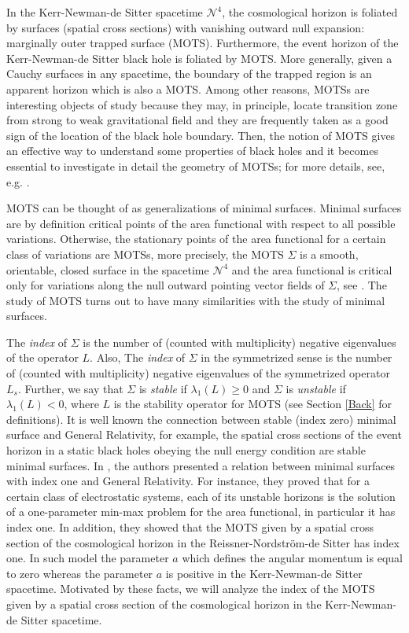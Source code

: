 \documentclass[a4paper, 11pt, reqno]{amsart}
\begin{document}
In the Kerr-Newman-de Sitter spacetime $\mathcal{N}^4$, the cosmological horizon is foliated by surfaces (spatial cross sections) with vanishing outward null expansion: marginally outer trapped surface (MOTS). Furthermore, the event horizon of the Kerr-Newman-de Sitter black hole is foliated by MOTS. More generally, given a Cauchy surfaces in any spacetime, the boundary of the trapped region is an apparent horizon which is also a MOTS. Among other reasons, MOTSs are interesting objects of study because they may, in principle, locate transition zone from strong to weak gravitational field and they are frequently taken as a good sign of the location of the black hole boundary. Then, the notion of MOTS gives an effective way to understand some properties of black holes and it becomes essential to investigate in detail the geometry of MOTSs; for more details, see, e.g. \cite{BKO, CGS,HE, HL, M}.  

MOTS can be thought of as generalizations of minimal surfaces. Minimal surfaces are by definition critical points of the area functional
with respect to all possible variations. Otherwise, the stationary points of the area functional for a certain class of variations are MOTSs, more precisely, the MOTS $\Sigma$ is a smooth, orientable, closed surface in the spacetime $\mathcal{N}^4$ and the area functional is critical only for variations along the null outward pointing vector fields of $\Sigma$, see \cite{M}.
 The study of MOTS turns out to have many similarities with the study of minimal surfaces. 

The {\it{index}} of $\Sigma$ is the number of (counted with multiplicity) negative eigenvalues of the operator $L$. Also, The {\it{index}} of $\Sigma$ in the symmetrized sense is the number of (counted with multiplicity) negative eigenvalues of the symmetrized operator $L_s$. Further, we say that $\Sigma$ is {\it{stable}} if  $\lambda_1(L)\geq0$ and $\Sigma$ is {\it{unstable}} if $\lambda_1(L)<0$, where $L$ is the stability operator for MOTS (see Section \ref{Back} for definitions). It is well known the connection between stable (index zero) minimal surface and General Relativity, for example, the spatial cross sections of the event horizon in a static black holes obeying the null energy condition are stable minimal surfaces. In \cite{CLS}, the authors presented a  relation between minimal surfaces with index one and General Relativity. For instance, they proved that for a certain class of electrostatic systems, each of its unstable horizons is the solution of a one-parameter min-max problem for the area functional, in particular it has index one. In addition, they showed that the MOTS given by a  spatial cross section of the cosmological horizon in the Reissner-Nordström-de Sitter has index one.  In such model the parameter $a$ which defines the angular momentum is equal to zero whereas the parameter $a$ is positive in the Kerr-Newman-de Sitter spacetime. Motivated by these facts, we will analyze the index of the MOTS given by a spatial cross section of the cosmological horizon in the Kerr-Newman-de Sitter spacetime.
\end{document}
